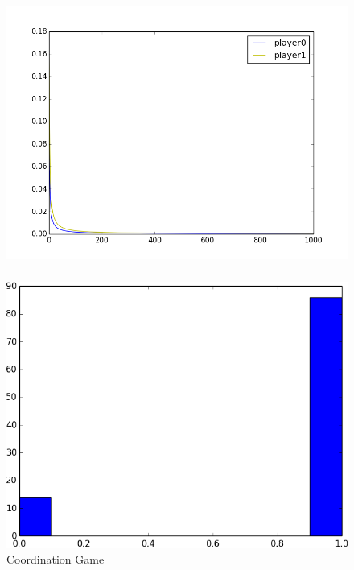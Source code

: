 \documentclass[dvipdfmx,fleqn]{beamer}
\begin{document}
\begin{frame}
\frametitle{}
\begin{figure}
 \centering
 \includegraphics[scale=0.58, bb=100 200 400 300]{coordinationgame_graph2.png}
 \label{fig:coordination_plot2}
\end{figure}
\end{frame}

\begin{frame}
\frametitle{}
\begin{figure}
 \centering
 \includegraphics[scale=0.58, bb=-250 -200 250 200]{coordination_histo1.0.png}
 \caption{Coordination Game}
 \label{fig:coordination_histo}
\end{figure}
\end{frame}
\end{document}
